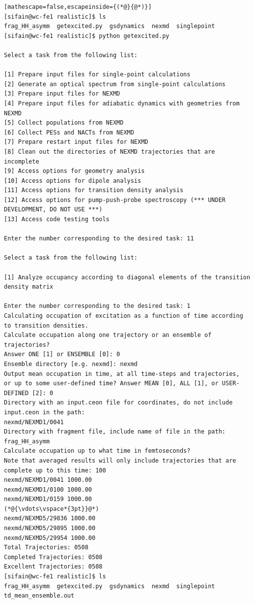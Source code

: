 \documentclass[letterpaper,12pt,titlepage]{article}
\begin{document}
\begin{lstlisting}[mathescape=false,escapeinside={(*@}{@*)}]
[sifain@wc-fe1 realistic]$ ls
frag_HH_asymm  getexcited.py  gsdynamics  nexmd  singlepoint
[sifain@wc-fe1 realistic]$ python getexcited.py 

Select a task from the following list:

[1] Prepare input files for single-point calculations
[2] Generate an optical spectrum from single-point calculations
[3] Prepare input files for NEXMD
[4] Prepare input files for adiabatic dynamics with geometries from NEXMD
[5] Collect populations from NEXMD
[6] Collect PESs and NACTs from NEXMD
[7] Prepare restart input files for NEXMD
[8] Clean out the directories of NEXMD trajectories that are incomplete
[9] Access options for geometry analysis
[10] Access options for dipole analysis
[11] Access options for transition density analysis
[12] Access options for pump-push-probe spectroscopy (*** UNDER DEVELOPMENT, DO NOT USE ***)
[13] Access code testing tools

Enter the number corresponding to the desired task: 11

Select a task from the following list:

[1] Analyze occupancy according to diagonal elements of the transition density matrix

Enter the number corresponding to the desired task: 1
Calculating occupation of excitation as a function of time according to transition densities.
Calculate occupation along one trajectory or an ensemble of trajectories?
Answer ONE [1] or ENSEMBLE [0]: 0
Ensemble directory [e.g. nexmd]: nexmd
Output mean occupation in time, at all time-steps and trajectories, 
or up to some user-defined time? Answer MEAN [0], ALL [1], or USER-DEFINED [2]: 0
Directory with an input.ceon file for coordinates, do not include input.ceon in the path: 
nexmd/NEXMD1/0041
Directory with fragment file, include name of file in the path: frag_HH_asymm
Calculate occupation up to what time in femtoseconds?
Note that averaged results will only include trajectories that are 
complete up to this time: 100
nexmd/NEXMD1/0041 1000.00
nexmd/NEXMD1/0100 1000.00
nexmd/NEXMD1/0159 1000.00
(*@{\vdots\vspace*{3pt}}@*)
nexmd/NEXMD5/29836 1000.00
nexmd/NEXMD5/29895 1000.00
nexmd/NEXMD5/29954 1000.00
Total Trajectories: 0508
Completed Trajectories: 0508
Excellent Trajectories: 0508
[sifain@wc-fe1 realistic]$ ls
frag_HH_asymm  getexcited.py  gsdynamics  nexmd  singlepoint  td_mean_ensemble.out
\end{lstlisting}
\end{document}
